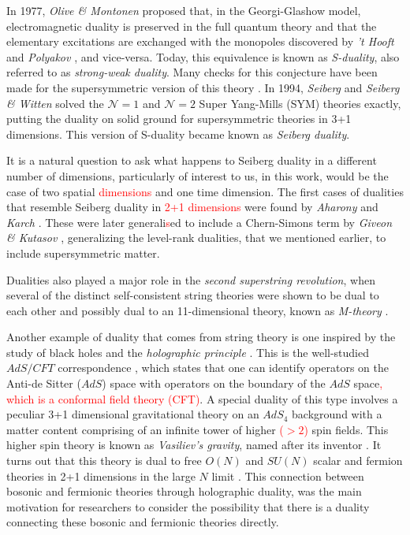 In 1977, \textit{Olive \& Montonen} \cite{Montonen:1977sn} proposed that, in the Georgi-Glashow model, electromagnetic duality is preserved in the full quantum theory and that the elementary excitations are exchanged with the monopoles discovered by \textit{'t Hooft} and \textit{Polyakov} \cite{Polyakov:1974ek, tHooft:1974kcl}, and vice-versa. Today, this equivalence is known as \textit{S-duality}, also referred to as \textit{strong-weak duality}. Many checks for this conjecture have been made for the supersymmetric version of this theory \cite{Osborn:1979tq, Witten:1978mh, Sen:1994yi, Vafa:1994tf}. In 1994, \textit{Seiberg} \cite{Seiberg:1994bz, Seiberg:1994pq} and \textit{Seiberg \& Witten} \cite{Seiberg:1994rs} solved the $\mathcal{N}=1$ and $\mathcal{N}=2$ Super Yang-Mills (SYM) theories exactly, putting the duality on solid ground for supersymmetric theories in 3+1 dimensions. This version of S-duality became known as \textit{Seiberg duality}.

It is a natural question to ask what happens to Seiberg duality in a different number of dimensions, particularly of interest to us, in this work, would be the case of two spatial \textcolor{red}{dimensions} and one time dimension. The first cases of dualities that resemble Seiberg duality in \textcolor{red}{2+1 dimensions} were found by \textit{Aharony} and \textit{Karch} \cite{Aharony:1997gp, Karch:1997ux}. These were later generali\textcolor{red}{s}ed to include a Chern-Simons term by \textit{Giveon \& Kutasov} \cite{Giveon:2008zn}, generalizing the level-rank dualities, that we mentioned earlier, to include supersymmetric matter.

Dualities also played a major role in the \textit{second superstring revolution}, when several of the distinct self-consistent string theories were shown to be dual to each other \cite{Sen:1994fa, Schwarz:1994xn, Sathiapalan:1986zb, Hull:1994ys} and possibly dual to an 11-dimensional theory, known as \textit{M-theory} \cite{Witten:1995ex}.

Another example of duality that comes from string theory is one inspired by the study of black holes and the \textit{holographic principle} \cite{Susskind:1994vu, tHooft:1993dmi}. This is the well-studied $AdS/CFT$ correspondence \cite{Aharony:1999ti, Maldacena:1997re}, which states that one can identify operators on the Anti-de Sitter ($AdS$) space with operators on the boundary of the $AdS$ space\textcolor{red}{, which is a conformal field theory (CFT)}. A special duality of this type involves a peculiar 3+1 dimensional gravitational theory on an $AdS_4$ background with a matter content comprising of an infinite tower of higher \textcolor{red}{($>2$)} spin  fields. This higher spin theory is known as \textit{Vasiliev's gravity}, named after its inventor \cite{Vasiliev:1992av}. It turns out that this theory is dual to free $O(N)$ and $SU(N)$ scalar and fermion theories in 2+1 dimensions in the large $N$ limit \cite{Sezgin:2003pt, Klebanov:2002ja}. This connection between bosonic and fermionic theories through holographic duality, was the main motivation for researchers to consider the possibility that there is a duality connecting these bosonic and fermionic theories directly. 

